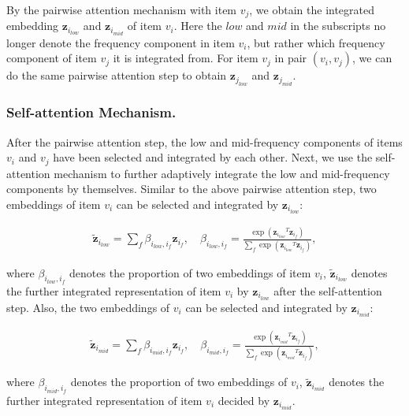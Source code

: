 \documentclass[letterpaper]{article} %
\begin{document}
By the pairwise attention mechanism with item $v_j$, we obtain the integrated embedding $\mathbf{z}_{i_{low}}$ and $\mathbf{z}_{i_{mid}}$ of item $v_i$. Here the $low$ and $mid$ in the subscripts no longer denote the frequency component in item $v_i$, but rather which frequency component of item $v_j$ it is integrated from. For item $v_j$ in pair $(v_i, v_j)$, we can do the same pairwise attention step to obtain $\mathbf{z}_{j_{low}}$ and $\mathbf{z}_{j_{mid}}$.

\subsubsection{Self-attention Mechanism.}
After the pairwise attention step, the low and mid-frequency components of items $v_i$ and $v_j$ have been selected and integrated by each other. Next, we use the self-attention mechanism to further adaptively integrate the low and mid-frequency components by themselves. Similar to the above pairwise attention step, two embeddings of item $v_i$ can be selected and integrated by $\mathbf{z}_{i_{low}}$:
\begin{small}
\begin{gather}
   \mathbf{\widetilde{z}}_{i_{low}}=\sum_{f}\beta_{i_{low},i_{f}}\mathbf{z}_{i_f}, \quad 
   \beta_{i_{low},i_f}=\frac{\exp({\mathbf{z}_{i_{low}}}^T\mathbf{z}_{i_f})}{\sum_f\exp({\mathbf{z}_{i_{low}}}^T\mathbf{z}_{i_f})},
   \label{eq:self_low}
\end{gather}
\end{small}
where $\beta_{i_{low},i_f}$ denotes the proportion of two embeddings of item $v_i$, $\mathbf{\widetilde{z}}_{i_{low}}$ denotes the further integrated representation of item $v_i$ by $\mathbf{z}_{i_{low}}$ after the self-attention step.
Also, the two embeddings of $v_i$ can be selected and integrated by $\mathbf{z}_{i_{mid}}$:
\begin{small}
\begin{gather}
   \mathbf{\widetilde{z}}_{i_{mid}}=\sum_{f}\beta_{i_{mid},i_{f}}\mathbf{z}_{i_f}, \quad
   \beta_{i_{mid},i_f}=\frac{\exp({\mathbf{z}_{i_{mid}}}^T\mathbf{z}_{i_f})}{\sum_f\exp({\mathbf{z}_{i_{mid}}}^T\mathbf{z}_{i_f})},
   \label{eq:self_mid}
\end{gather}
\end{small}
where $\beta_{i_{mid},i_f}$ denotes the proportion of two embeddings of $v_i$, $\mathbf{\widetilde{z}}_{i_{mid}}$ denotes the further integrated representation of item $v_i$ decided by $\mathbf{z}_{i_{mid}}$.
\end{document}
